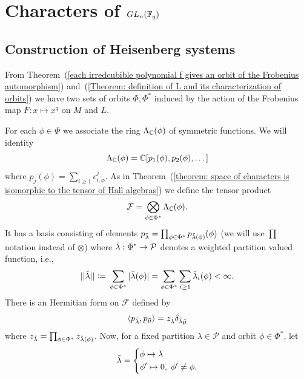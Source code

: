 \chapter{\texorpdfstring{Characters of $GL_n(\mathbb{F}_q)$}{Characters of GLn(Fq)}}
\section{Construction of Heisenberg systems}
From Theorem~(\ref{each irredcubible polynomial f gives an orbit of the Frobenius automorphism}) and~(\ref{Theorem: definition of L and its characterization of orbits}) we have two sets of orbits $\Phi, \Phi^*$ induced by the action of the Frobenius map $F: x\mapsto x^q$ on $M$ and $L$.\par
For each $\phi\in\Phi$ we associate the ring $\Lambda_{\mathbb{C}}(\phi)$ of symmetric functions. We will identity 
\begin{equation}
    \Lambda_{\mathbb{C}}(\phi) = \mathbb{C}[p_1(\phi),p_2(\phi),\dots]
\end{equation}
where $p_j(\phi)=\sum_{i\geq1}\epsilon_{i,\phi}^j$. As in Theorem~(\ref{theorem: space of characters is isomorphic to the tensor of Hall algebras}) we define the tensor product
\begin{equation}
    \mathcal{F} = \bigotimes_{\phi\in\Phi^*}\Lambda_{\mathbb{C}}(\phi).
\end{equation}
It has a basis consisting of elements $p_{\Tilde{\lambda}} =\prod_{\phi\in\Phi^*}p_{\Tilde{\lambda}(\phi)}(\phi)$ (we will use $\prod$ notation instead of $\otimes$) where $\Tilde{\lambda}:\Phi^*\rightarrow \mathcal{P}$ denotes a weighted partition valued function, i.e.,
\begin{equation}
    ||\tlambda|| \bydef \sum_{\phi\in\Phi^*}|\tlambda(\phi)|=\sum_{\phi\in\Phi^*}\sum_{i\geq 1}\tlambda_i(\phi)<\infty.
\end{equation}
There is an Hermitian form on $\mathcal{F}$ defined by
\begin{equation}\label{Equation: hermitian form on mathcal F}
    \langle p_{\Tilde{\lambda}} ,p_{\Tilde{\mu}} \rangle = z_{\Tilde{\lambda}}\delta_{\Tilde{\lambda}\Tilde{\mu}}
\end{equation}
where $z_{\Tilde{\lambda}} = \prod_{\phi\in\Phi^*}z_{\Tilde{\lambda}(\phi)}$. Now, for a fixed partition $\lambda\in\mathcal{P}$ and orbit $\phi\in\Phi^*$, let
\begin{align*}
   \Tilde{\lambda} = 
   \left\{\begin{aligned}
        &\phi\mapsto \lambda\\
        &\phi^\prime \mapsto 0,\;\phi^\prime\neq\phi.
    \end{aligned}\right.
\end{align*}
